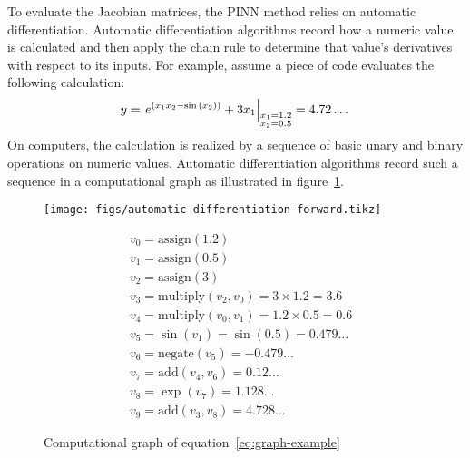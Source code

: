 
To evaluate the Jacobian matrices, the PINN method relies on automatic differentiation.
Automatic differentiation algorithms record how a numeric value is calculated and then apply the chain rule to determine that value's derivatives with respect to its inputs.
For example, assume a piece of code evaluates the following calculation:
\begin{equation}\label{eq:graph-example}
 y = \left.{e^{\left(x_1x_2-\sin{\left(x_2\right)}\right)}+3x_1}\right|_{\begin{subarray}{l}x_1=1.2 \\ x_2=0.5\end{subarray}} = 4.72\dots
\end{equation}
On computers, the calculation is realized by a sequence of basic unary and binary operations on numeric values.
Automatic differentiation algorithms record such a sequence in a computational graph as illustrated in figure~\ref{fig:automatic-differentiation-forward}.
\begin{center}
\begin{figure}[hbt!]
    \Centering
    \begin{minipage}[c]{0.4\textwidth}
        \texttt{[image: figs/automatic-differentiation-forward.tikz]}
    \end{minipage}%
    \begin{minipage}[c]{0.5\textwidth}
        \scriptsize
        \singlespacing
        \begin{equation*}
            \begin{aligned}
                &v_0 = \mathrm{assign}\left(1.2\right) \\
                &v_1 = \mathrm{assign}\left(0.5\right) \\
                &v_2 = \mathrm{assign}\left(3\right) \\
                &v_3 = \mathrm{multiply}\left(v_2, v_0\right)  = 3 \times 1.2 = 3.6 \\
                &v_4 = \mathrm{multiply}\left(v_0, v_1\right) = 1.2 \times 0.5 = 0.6 \\
                &v_5 = \sin\left({v_1}\right) = \sin\left(0.5\right) = 0.479\dots \\
                &v_6 = \mathrm{negate}\left(v_5\right) = -0.479\dots \\
                &v_7 = \mathrm{add}\left(v_4, v_6\right) = 0.12\dots \\
                &v_8 = \exp\left({v_7}\right) = 1.128\dots \\
                &v_9 = \mathrm{add}\left(v_3, v_8\right) = 4.728\dots
            \end{aligned}
        \end{equation*}
    \end{minipage}
    \caption{Computational graph of equation~\ref{eq:graph-example}}%
    \label{fig:automatic-differentiation-forward}
\end{figure}
\end{center}

